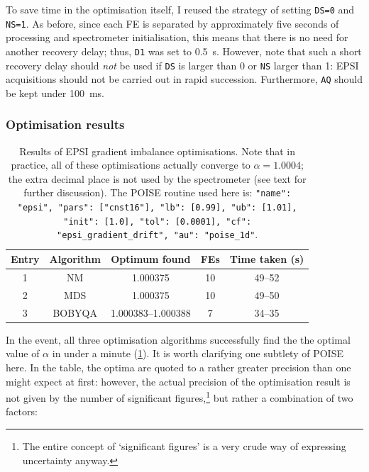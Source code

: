 To save time in the optimisation itself, I reused the strategy of setting \texttt{DS=0} and \texttt{NS=1}.
As before, since each FE is separated by approximately five seconds of processing and spectrometer initialisation, this means that there is no need for another recovery delay; thus, \texttt{D1} was set to \SI{0.5}{\s}.
However, note that such a short recovery delay should \textit{not} be used if \texttt{DS} is larger than 0 or \texttt{NS} larger than 1: EPSI acquisitions should not be carried out in rapid succession.
Furthermore, \texttt{AQ} should be kept under \SI{100}{\ms}.


\subsubsection{Optimisation results}

\begin{table}[htb]
    \centering
    \begin{tabular}{ccccc}
        \toprule
        Entry & Algorithm & Optimum found      & FEs & Time taken (\si{\s}) \\
        \midrule
        1     & NM        & 1.000375           & 10  & 49--52               \\
        2     & MDS       & 1.000375           & 10  & 49--50               \\
        3     & BOBYQA    & 1.000383--1.000388 & 7   & 34--35               \\
        \bottomrule
    \end{tabular}
    \caption[EPSI gradient imbalance optimisations]{
        Results of EPSI gradient imbalance optimisations.
        Note that in practice, all of these optimisations actually converge to $\alpha = 1.0004$; the extra decimal place is not used by the spectrometer (see text for further discussion).
        The POISE routine used here is: \texttt{{"name": "epsi", "pars": ["cnst16"], "lb": [0.99], "ub": [1.01], "init": [1.0], "tol": [0.0001], "cf": "epsi_gradient_drift", "au": "poise_1d"}}.
    }
    \label{tbl:poise_epsi}
\end{table}

In the event, all three optimisation algorithms successfully find the the optimal value of $\alpha$ in under a minute (\cref{tbl:poise_epsi}).
It is worth clarifying one subtlety of POISE here.
In the table, the optima are quoted to a rather greater precision than one might expect at first: however, the actual precision of the optimisation result is not given by the number of significant figures,\footnote{The entire concept of `significant figures' is a very crude way of expressing uncertainty anyway.} but rather a combination of two factors:

